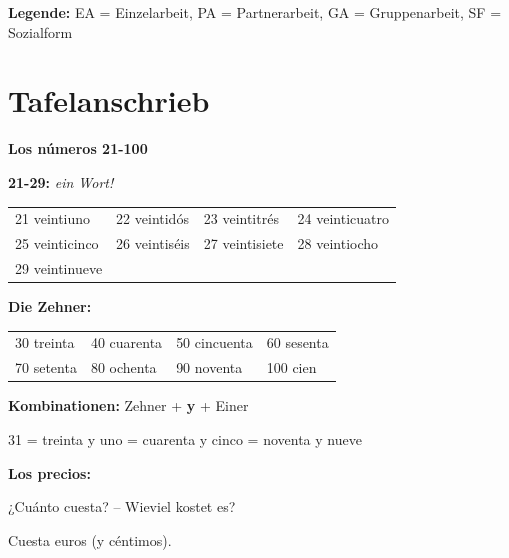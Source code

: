 \documentclass[11pt,a4paper]{article}
\begin{document}
\textbf{Legende:} EA = Einzelarbeit, PA = Partnerarbeit, GA = Gruppenarbeit, SF = Sozialform

\section{Tafelanschrieb}

\begin{infobox}[Tafelanschrieb]
\textbf{Los números 21-100}

\vspace{1em}

\textbf{21-29:} \textit{ein Wort!}

\begin{tabular}{llll}
21 veintiuno & 22 veintidós & 23 veintitrés & 24 veinticuatro \\
25 veinticinco & 26 veintiséis & 27 veintisiete & 28 veintiocho \\
29 veintinueve & & & \\
\end{tabular}

\vspace{1em}

\textbf{Die Zehner:}

\begin{tabular}{llll}
30 treinta & 40 cuarenta & 50 cincuenta & 60 sesenta \\
70 setenta & 80 ochenta & 90 noventa & 100 cien \\
\end{tabular}

\vspace{1em}

\textbf{Kombinationen:} Zehner + \textbf{y} + Einer

31 = treinta y uno  = cuarenta y cinco  = noventa y nueve

\vspace{1em}

\textbf{Los precios:}

¿Cuánto cuesta? -- Wieviel kostet es?

Cuesta \underline{\hspace{1cm}} euros (y \underline{\hspace{1cm}} céntimos).
\end{infobox}

\end{document}
